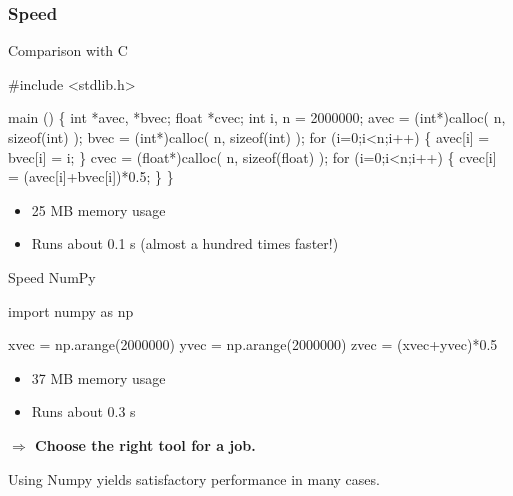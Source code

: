 \documentclass[handout]{beamer}
\begin{document}
\begin{frame}
    \frametitle{Speed}
    Comparison with C
\begin{myColorBox}{0.9}{}
\begin{semiverbatim}
\tiny#include <stdlib.h>

main () \{
    int *avec, *bvec;
    float *cvec;
    int i, n = 2000000;
    avec = (int*)calloc( n, sizeof(int) );
    bvec = (int*)calloc( n, sizeof(int) );
    for (i=0;i<n;i++) \{
        avec[i] = bvec[i] = i;
    \}
    cvec = (float*)calloc( n, sizeof(float) );
    for (i=0;i<n;i++) \{
        cvec[i] = (avec[i]+bvec[i])*0.5;
    \}
\}
\end{semiverbatim}
\end{myColorBox}
    \begin{itemize}
    	\item 25 MB memory usage
	\item Runs about 0.1 s (almost a hundred times faster!)
    \end{itemize}
\end{frame}

\begin{frame}{Speed}
    NumPy
\begin{myColorBox}{0.9}{}
\begin{semiverbatim}
import numpy as np

xvec = np.arange(2000000)
yvec = np.arange(2000000)
zvec = (xvec+yvec)*0.5
\end{semiverbatim}
\end{myColorBox}
    \begin{itemize}
    	\item 37 MB memory usage
	\item Runs about 0.3 s
    \end{itemize}

    \textbf{$\Rightarrow$ Choose the right tool for a job.}
    \vspace{1em}

    Using Numpy yields satisfactory performance in many cases.

\end{frame}
\end{document}
